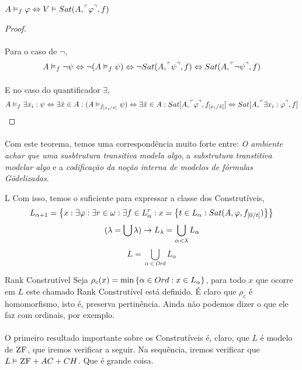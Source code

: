 \begin{theorem}{$A\vDash_f\varphi \Leftrightarrow V\vDash Sat(A,{}^\ulcorner{\varphi}^\urcorner,f)$}
\begin{proof}
                \paragraph{}
                    Para o caso de  $\neg$,
                $$A\vDash_f\neg\psi\BIM\neg(A\vDash_f\psi)\BIM\neg Sat(A,\FMLA{\psi},f)\BIM Sat(A,\FMLA{\neg\psi},f)$$
                \paragraph{}
                    E no caso do quantificador $\exists$,
                $$A\vDash_f\exists x_i:\psi\BIM\exists\hat x\in A:(A\vDash_{f_{[x_i\slash\hat x]}}\psi)\BIM\exists\hat x\in A:Sat[A,\FMLA{\varphi}, f_{[x_i\slash\hat x]}]\BIM Sat[A,\FMLA{\exists x_i:\varphi}, f]$$
                \eop
            \end{proof}
        \end{theorem}
        \paragraph{}
            Com este teorema, temos uma correspondência muito forte entre: \textit{O ambiente achar que uma susbtrutura transitiva modela algo}, a
            \textit{substrutura transtitiva modelar algo} e a \textit{codificação da noção interna de modelos de fórmulas Gödelizadas}.

        \begin{definition}{L}
            Com isso, temos o suficiente para expressar a classe dos Construtíveis,
            $$ L_{\alpha+1} = \SET{x : \exists \varphi:\exists r\in\omega:\exists f\in L_\alpha^r: x = \SET{t\in L_\alpha : Sat(A,\varphi,f_{[0\slash t]})}} $$ 
            $$ (\lambda     = \bigcup\lambda) \rightarrow L_\lambda = \bigcup_{\alpha < \lambda} L_\alpha $$ 
            $$ L = \bigcup_{\alpha\in Ord} L_\alpha $$
        \end{definition}
        \begin{definition}{Rank Construtível}
            Seja $\rho_c(x)=\min\SET{\alpha\in Ord: x\in L_\alpha}$, para todo $x$ que ocorre em $L$ este chamado Rank Construtível está definido.
            É claro que $\rho_c$ é homomorfismo, isto é, preserva pertinência. Ainda não podemos dizer o que ele faz com ordinais, por exemplo.
        \end{definition}
        \paragraph{}
            O primeiro resultado importante sobre os Construtíveis é, claro, que $L$ é modelo de $\text{\sc ZF}$, que iremos verificar a seguir. Na sequência, iremos verificar 
            que $L \vDash \text{\sc ZF}+AC+CH$. Que é grande coisa.

